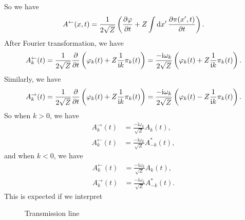 \documentclass[hyperref, a4paper]{article}
\newcommand*{\ii}{\mathrm{i}}
\begin{document}
\begin{itemize}
\begin{equation}
\end{equation}
So we have 
\begin{equation}
    A^\leftarrow(x, t) = \frac{1}{2 \sqrt{Z}} \left( \pdv{\varphi}{t} + Z \int \dd{x'} \pdv{\pi(x', t)}{t} \right).
\end{equation}
After Fourier transformation, we have 
\begin{equation}
    A_k^\leftarrow(t) = \frac{1}{2 \sqrt{Z}} \pdv{t} \left( \varphi_k(t) + Z \frac{1}{\ii k} \pi_k(t) \right)
    = \frac{- \ii \omega_k}{2 \sqrt{Z}} \left( \varphi_k(t) + Z \frac{1}{\ii k} \pi_k(t) \right).
\end{equation}
Similarly, we have 
\begin{equation}
    A_k^\rightarrow(t) = \frac{1}{2 \sqrt{Z}} \pdv{t} \left( \varphi_k(t) + Z \frac{1}{\ii k} \pi_k(t) \right)
    = \frac{- \ii \omega_k}{2 \sqrt{Z}} \left( \varphi_k(t) - Z \frac{1}{\ii k} \pi_k(t) \right).
\end{equation}
So when $k > 0$, we have 
\begin{equation}
    \begin{aligned}
        A_k^\rightarrow(t) &= \frac{- \ii \omega_k}{\sqrt{Z}} A_k(t), \\
        A_k^\leftarrow(t) &= \frac{- \ii \omega_k}{\sqrt{Z}} A_{-k}^*(t),
    \end{aligned}
\end{equation}
and when $k < 0$, we have 
\begin{equation}
    \begin{aligned}
        A_k^\leftarrow(t) &= \frac{- \ii \omega_k}{\sqrt{Z}} A_k(t), \\
        A_k^\rightarrow(t) &= \frac{- \ii \omega_k}{\sqrt{Z}} A_{-k}^*(t).
    \end{aligned}
\end{equation}
This is expected if we interpret 

\end{itemize}

\begin{figure}
    \centering
    
    \caption{Transmission line}
    \label{fig:transmission}
\end{figure}
\end{document}

